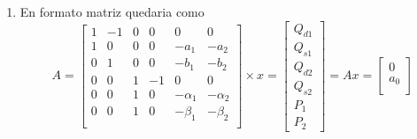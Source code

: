 \begin{ejercicio}
\begin{enumerate}
\[        \quad
        Ax = \begin{bmatrix}
            Q_d \\
            Q_s
        \end{bmatrix}
        \]
        Si se disponen las tres variables en el orden \(Q_d\), \(Q_s\) y \(P\), la matriz quedaria como
        \[
        A = \begin{bmatrix}
            1 & -1 & 0 \\
            1 & 0 & b \\
            0 & 1 & -d
        \end{bmatrix}
        \times
        x = \begin{bmatrix}
            Q_d \\
            Q_s \\
            P
        \end{bmatrix}
        = 
        Ax = \begin{bmatrix}
            0 \\
            a \\
            c
        \end{bmatrix}
        \]
        El vector constantes es \(Ax\)
        \item En formato matriz quedaria como
        \[
        A = \begin{bmatrix}
            1 & -1 & 0 & 0 & 0 & 0 \\
            1 & 0 & 0 & 0 & -a_1 & -a_2 \\
            0 & 1 & 0 & 0 & -b_1 & -b_2 \\
            0 & 0 & 1 & -1 & 0 & 0 \\
            0 & 0 & 1 & 0 & -\alpha_1 & -\alpha_2 \\
            0 & 0 & 1 & 0 & -\beta_1 & -\beta_2 \\
        \end{bmatrix}
        \times
        x = \begin{bmatrix}
            Q_{d1} \\
            Q_{s1} \\
            Q_{d2} \\
            Q_{s2} \\
            P_1 \\
            P_2
        \end{bmatrix}
        = 
        Ax = \begin{bmatrix}
            0 \\
            a_0 \\

\end{bmatrix}\]
\end{enumerate}
\end{ejercicio}
